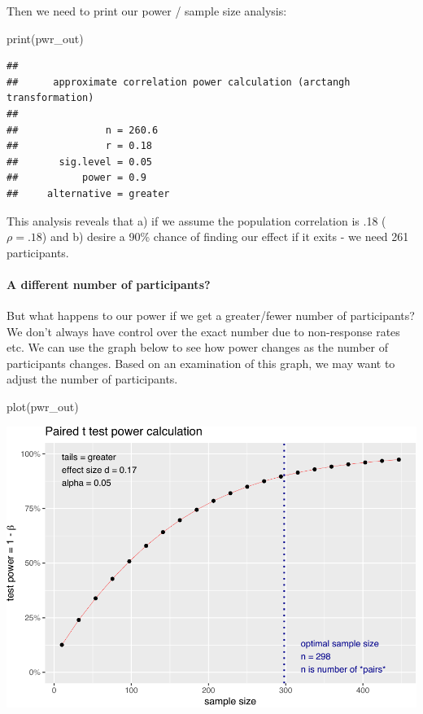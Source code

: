 \documentclass[
]{krantz}
\makeatletter
\newenvironment{Shaded}{\begin{snugshade}}{\end{snugshade}}
\newcommand{\FunctionTok}[1]{\textcolor[rgb]{0,0,0}{#1}}
\newcommand{\NormalTok}[1]{#1}
\newenvironment{kframe}{%
\medskip{}
\setlength{\fboxsep}{.8em}
 \def\at@end@of@kframe{}%
 \ifinner\ifhmode%
  \def\at@end@of@kframe{\end{minipage}}%
  \begin{minipage}{\columnwidth}%
 \fi\fi%
 \def\FrameCommand##1{\hskip\@totalleftmargin \hskip-\fboxsep
 \colorbox{shadecolor}{##1}\hskip-\fboxsep
     \hskip-\linewidth \hskip-\@totalleftmargin \hskip\columnwidth}%
 \MakeFramed {\advance\hsize-\width
   \@totalleftmargin\z@ \linewidth\hsize
   \@setminipage}}%
 {\par\unskip\endMakeFramed%
 \at@end@of@kframe}
\renewenvironment{Shaded}{\begin{kframe}}{\end{kframe}}
\makeatother
\begin{document}
Then we need to print our power / sample size analysis:

\begin{Shaded}
\begin{Highlighting}[]
\FunctionTok{print}\NormalTok{(pwr\_out)}
\end{Highlighting}
\end{Shaded}

\begin{verbatim}
## 
##      approximate correlation power calculation (arctangh transformation) 
## 
##               n = 260.6
##               r = 0.18
##       sig.level = 0.05
##           power = 0.9
##     alternative = greater
\end{verbatim}

This analysis reveals that a) if we assume the population correlation is .18 (\(\rho = .18\)) and b) desire a 90\% chance of finding our effect if it exits - we need 261 participants.

\hypertarget{a-different-number-of-participants-2}{%
\paragraph{A different number of participants?}\label{a-different-number-of-participants-2}}

But what happens to our power if we get a greater/fewer number of participants? We don't always have control over the exact number due to non-response rates etc. We can use the graph below to see how power changes as the number of participants changes. Based on an examination of this graph, we may want to adjust the number of participants.

\begin{Shaded}
\begin{Highlighting}[]
\FunctionTok{plot}\NormalTok{(pwr\_out)}
\end{Highlighting}
\end{Shaded}

\includegraphics{bookdown_files/figure-latex/unnamed-chunk-357-1.pdf}
\end{document}
